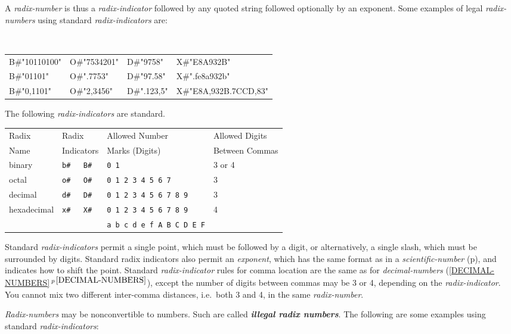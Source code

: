 \documentclass[12pt]{article}
\newcommand{\skey}[2]{{\bf \em #1#2}\index{#1}}
\newcommand{\secref}[1]{\ref{#1}$\,^{p\,\pageref{#1}}$}
\newcommand{\pagref}[1]{p\pageref{#1}}
\newenvironment{indpar}[1][0.3in]%
	{\begin{list}{}%
		     {\setlength{\itemsep}{0in}%
		      \setlength{\topsep}{0in}%
		      \setlength{\parsep}{1ex}%
		      \setlength{\labelwidth}{#1}%
		      \setlength{\leftmargin}{#1}%
		      \addtolength{\leftmargin}{\labelsep}}%
	 \item}%
	{\end{list}}
\begin{document}
A {\em radix-number} is thus a {\em radix-indicator} followed by
any quoted string followed optionally by an exponent.
Some examples of legal {\em radix-numbers}
using standard {\em radix-indicators} are:

\begin{indpar}[0.1in]
\tt
\begin{tabular}{@{}l@{~~~}l@{~~~}l@{~~~}l@{}}
B\#"10110100"	& O\#"7534201" & D\#"9758"	& X\#"E8A932B" \\
B\#"01101"	& O\#".7753"   & D\#"97.58"	& X\#".fe8a932b" \\
B\#"0,1101"	& O\#"2,3456"  & D\#".123,5"	& X\#"E8A,932B.7CCD,83" \\
\end{tabular}
\end{indpar}

The following {\em radix-indicators} are standard.

\begin{center}
\begin{tabular}{l@{~~~~~}l@{~~~~~}l@{~~~~~}l}
Radix	& Radix		 & Allowed Number	& Allowed Digits \\
Name	& Indicators     & Marks (Digits)	& Between Commas \\[1ex]
binary	& \tt b\#~~~B\#	 & \tt 0 1		& 3 or 4 \\
octal	& \tt o\#~~~O\#	 & \tt 0 1 2 3 4 5 6 7	& 3 \\
decimal	& \tt d\#~~~D\#	 & \tt 0 1 2 3 4 5 6 7 8 9
						& 3 \\
hexadecimal
	& \tt x\#~~~X\#	 & \tt 0 1 2 3 4 5 6 7 8 9
						& 4 \\
	&		 & \tt a b c d e f A B C D E F
\end{tabular}
\end{center}

Standard {\em radix-indicators} permit a single point, which must
be followed by a digit, or alternatively, a single slash, which must
be surrounded by digits.  Standard radix indicators also permit an
{\em exponent}, which has the same format as in a
{\em scientific-number} (\pagref{SCIENTIFIC-NUMBER}), and indicates
how to shift the point.
Standard {\em radix-indicator}
rules for comma location are the same as for {\em decimal-numbers}
(\secref{DECIMAL-NUMBERS}), except the number of digits between commas may
be 3 or 4, depending on the {\em radix-indicator}.  You cannot mix two
different inter-comma distances, i.e.~both 3 and 4,
in the same {\em radix-number}.

{\em Radix-numbers} may be nonconvertible to numbers.  Such are
called \skey{illegal radix number}s.  The following are some examples
using standard {\em radix-indicators}:
\end{document}
